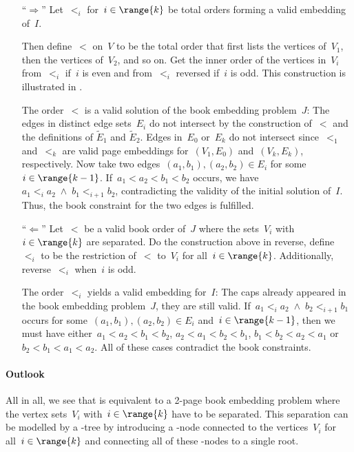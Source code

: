 \begin{myproof}
\begin{itemize}
\item[]
\item[``$\Rightarrow$''] Let~$<_i$ for~$i \in \range{k}$ be total orders forming a valid 
embedding of~$I$. 

Then define~$<$ on~$V$ to be the total order that first lists the
vertices of~$V_1$, then the vertices of~$V_2$, and so on. Get the inner order of the vertices
in~$V_i$ from~$<_i$ if~$i$ is even and from~$<_i$ reversed if~$i$ is odd. This
construction is illustrated in .

The order~$<$ is a valid solution of the book embedding problem~$J$:
The edges in distinct edge sets~$E_i$ do not intersect by the construction of~$<$ and the definitions
of $\widetilde{E}_1$ and $\widetilde{E}_2$. Edges in~$E_0$ or~$E_k$ do not intersect since~$<_1$
and~$<_k$ are valid page embeddings for~$(V_1, E_0)$ and~$(V_k, E_k)$, respectively. Now take
two edges~$(a_1, b_1), (a_2, b_2) \in E_i$ for some~$i \in \range{k-1}$. If~$a_1 < a_2 < b_1 < b_2$
occurs, we have~$a_1 <_i a_2\;\land\;b_1 <_{i+1} b_2$, contradicting the validity of
the initial solution of~$I$. Thus, the book constraint for the two edges is fulfilled.
\item[``$\Leftarrow$''] Let~$<$ be a valid book order of~$J$ where
the sets~$V_i$ with~$i \in \range{k}$ are separated. Do the construction above in reverse, \ie
define~$<_i$ to be the restriction of~$<$ to~$V_i$ for all~$i \in \range{k}$. Additionally,
reverse~$<_i$ when~$i$ is odd.

The order~$<_i$ yields a valid embedding for~$I$: The caps already appeared in the book embedding
problem~$J$, \ie they are still valid. If~$a_1 <_i a_2\;\land\;b_2 <_{i+1} b_1$ occurs for some~$(a_1, b_1), (a_2, b_2) \in E_i$ and~$i \in \range{k-1}$, then we must have either~$a_1 < a_2 < b_1 < b_2$,
$a_2 < a_1 < b_2 < b_1$, $b_1 < b_2 < a_2 < a_1$ or~$b_2 < b_1 < a_1 < a_2$. All of these
cases contradict the book constraints.\qedhere
\end{itemize}
\end{myproof}

\paragraph{Outlook}

All in all, we see that \probMul is equivalent to a 2-page book
embedding problem where the vertex sets~$V_i$ with~$i \in \range{k}$ have to be 
separated. This separation can be modelled by a \PT-tree by introducing a \PT-node
connected to the vertices~$V_i$ for all~$i \in \range{k}$ and connecting all 
of these \PT-nodes to a single root. 

